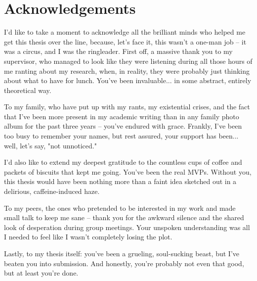 \clearpage
\chapter*{Acknowledgements}
I’d like to take a moment to acknowledge all the brilliant minds who helped me get this thesis over the line, because, let’s face it, this wasn’t a one-man job – it was a circus, and I was the ringleader. First off, a massive thank you to my supervisor, who managed to look like they were listening during all those hours of me ranting about my research, when, in reality, they were probably just thinking about what to have for lunch. You’ve been invaluable... in some abstract, entirely theoretical way.

To my family, who have put up with my rants, my existential crises, and the fact that I’ve been more present in my academic writing than in any family photo album for the past three years – you’ve endured with grace. Frankly, I’ve been too busy to remember your names, but rest assured, your support has been... well, let’s say, "not unnoticed."

I’d also like to extend my deepest gratitude to the countless cups of coffee and packets of biscuits that kept me going. You’ve been the real MVPs. Without you, this thesis would have been nothing more than a faint idea sketched out in a delirious, caffeine-induced haze.

To my peers, the ones who pretended to be interested in my work and made small talk to keep me sane – thank you for the awkward silence and the shared look of desperation during group meetings. Your unspoken understanding was all I needed to feel like I wasn’t completely losing the plot.

Lastly, to my thesis itself: you’ve been a grueling, soul-sucking beast, but I’ve beaten you into submission. And honestly, you’re probably not even that good, but at least you’re done.
